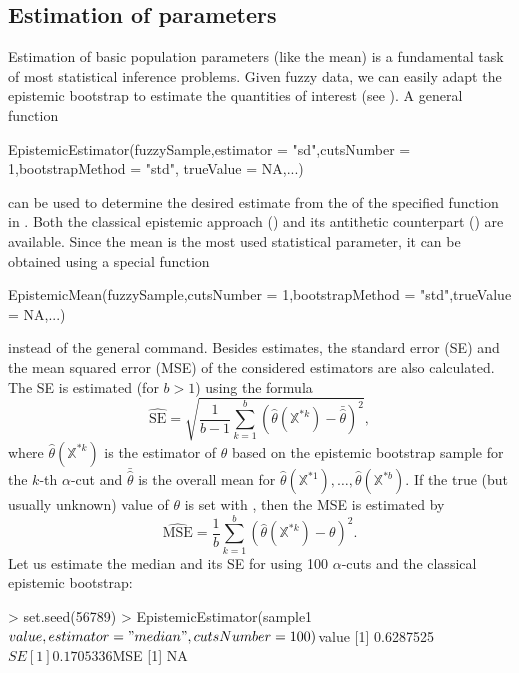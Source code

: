 \subsection{Estimation of parameters}
Estimation of basic population parameters (like the mean) is a fundamental task of most statistical inference problems. Given fuzzy data, we can easily adapt the epistemic bootstrap to estimate the quantities of interest (see  \citep{pgmr2022}).
A general function
\begin{example}
EpistemicEstimator(fuzzySample,estimator = "sd",cutsNumber = 1,bootstrapMethod = "std",
  trueValue = NA,...)
\end{example} 
can be used to determine the desired estimate from the  of the specified function in .
Both the classical epistemic approach () and its antithetic counterpart () are available.
Since the mean is the most used statistical parameter, it can be obtained using a special function
\begin{example}
EpistemicMean(fuzzySample,cutsNumber = 1,bootstrapMethod = "std",trueValue = NA,...)
\end{example}
instead of the general command.
Besides estimates, the standard error (SE) and the mean squared error (MSE) of the considered estimators are also calculated.
The SE is estimated (for $b >1$) using the formula
\begin{equation}
\label{frachetse}
	\widehat{\mathrm{SE}}=\sqrt{\frac{1}{b-1} \sum_{k=1}^{b} \left ( \hat{\theta} \left (\mathbb{X}^{*k} \right) - \bar{\hat{\theta}} \right )^2}  ,
\end{equation}
where $\hat{\theta} \left (\mathbb{X}^{*k} \right) $ is the estimator of $\theta$ based on the epistemic bootstrap sample for the $k$-th $\alpha$-cut and $\bar{\hat{\theta}}$ is the overall mean for $\hat{\theta} \left (\mathbb{X}^{*1} \right),\ldots,\hat{\theta} \left (\mathbb{X}^{*b} \right)$.
If the true (but usually unknown) value of $\theta$ is set with , then the MSE is estimated by
\begin{equation}
\label{frachetmse}
	\widehat{\mathrm{MSE}}=\frac{1}{b} \sum_{k=1}^{b} \left ( \hat{\theta} \left (\mathbb{X}^{*k} \right) - \theta \right )^2 .
\end{equation}
Let us estimate the median and its SE for  using 100 $\alpha$-cuts and the classical epistemic bootstrap:
\begin{example}
> set.seed(56789)
> EpistemicEstimator(sample1$value, estimator = "median",cutsNumber = 100)
$value
[1] 0.6287525
$SE
[1] 0.1705336
$MSE
[1] NA
\end{example} 
